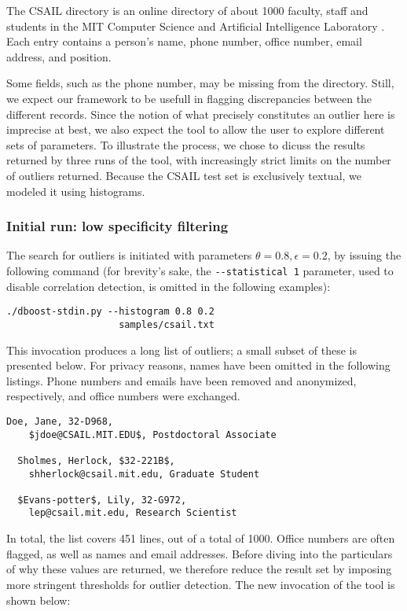 The CSAIL directory is an online directory of about 1000 faculty, staff and students in the MIT Computer Science and Artificial Intelligence Laboratory \cite{CSAILDirectory}. Each entry contains a person's name, phone number, office number, email address, and position.

Some fields, such as the phone number, may be missing from the directory. Still, we expect our framework to be usefull in flagging discrepancies between the different records. Since the notion of what precisely constitutes an outlier here is imprecise at best, we also expect the tool to allow the user to explore different sets of parameters. To illustrate the process, we chose to dicuss the results returned by three runs of the tool, with increasingly strict limits on the number of outliers returned. Because the CSAIL test set is exclusively textual, we modeled it using histograms.

\subsubsection{Initial run: low specificity filtering}
The search for outliers is initiated with parameters $\theta = 0.8, \epsilon = 0.2$, by issuing the following command (for brevity's sake, the \lstinline{--statistical 1} parameter, used to disable correlation detection, is omitted in the following examples):

\begin{lstlisting}[gobble=2]
  ./dboost-stdin.py --histogram 0.8 0.2 
                    samples/csail.txt
\end{lstlisting}

This invocation produces a long list of outliers; a small subset of these is presented below. For privacy reasons, names have been omitted in the following listings. Phone numbers and emails have been removed and anonymized, respectively, and office numbers were exchanged.

\begin{lstlisting}[gobble=2]
  Doe, Jane, 32-D968, 
    $jdoe@CSAIL.MIT.EDU$, Postdoctoral Associate

  Sholmes, Herlock, $32-221B$, 
    shherlock@csail.mit.edu, Graduate Student

  $Evans-potter$, Lily, 32-G972, 
    lep@csail.mit.edu, Research Scientist
\end{lstlisting}

In total, the list covers 451 lines, out of a total of 1000. Office numbers are often flagged, as well as names and email addresses. Before diving into the particulars of why these values are returned, we therefore reduce the result set by imposing more stringent thresholds for outlier detection. The new invocation of the tool is shown below: 


